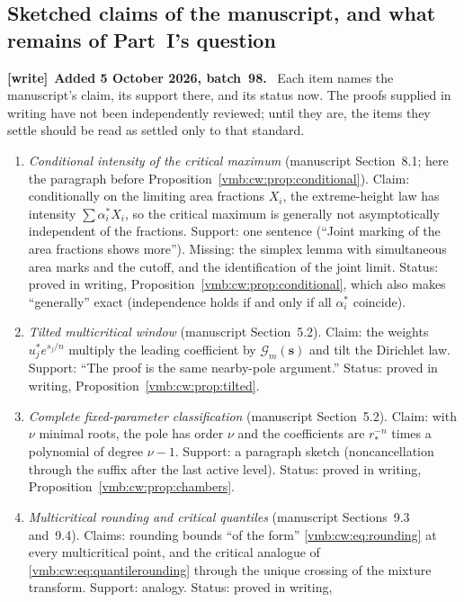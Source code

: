 \documentclass[11pt,a4paper]{article}
\numberwithin{equation}{section}
\theoremstyle{definition}\newtheorem{definition}[theorem]{Definition}
\theoremstyle{remark}\newtheorem{remark}[theorem]{Remark}
\newenvironment{writenote}[1][]{\par\smallskip\begingroup\small
 \noindent\textbf{[write]}\if\relax\detokenize{#1}\relax\else~\textbf{#1.}\fi\ }%
 {\par\endgroup\smallskip}
\begin{document}
\subsection{Sketched claims of the manuscript, and what remains of Part~I's question}
\label{vmb:cw:sec:q-write}
\begin{writenote}[Added 5 October 2026, batch~98]
Each item names the manuscript's claim, its support there, and its status
now. The proofs supplied in writing have not been independently reviewed;
until they are, the items they settle should be read as settled only to that
standard.
\begin{enumerate}[leftmargin=*,itemsep=2pt]
\item \emph{Conditional intensity of the critical maximum} (manuscript
 Section~8.1; here the paragraph before
 Proposition~\ref{vmb:cw:prop:conditional}). Claim: conditionally on the limiting
 area fractions $X_i$, the extreme-height law has intensity
 $\sum\alpha_i^*X_i$, so the critical maximum is generally not
 asymptotically independent of the fractions. Support: one sentence (``Joint
 marking of the area fractions shows more''). Missing: the simplex lemma with
 simultaneous area marks and the cutoff, and the identification of the joint
 limit. Status: proved in writing, Proposition~\ref{vmb:cw:prop:conditional},
 which also makes ``generally'' exact (independence holds if and only if all
 $\alpha_i^*$ coincide).
\item \emph{Tilted multicritical window} (manuscript Section~5.2). Claim: the
 weights $u_j^*e^{s_j/n}$ multiply the leading coefficient by
 $\mathcal G_m(\bm s)$ and tilt the Dirichlet law. Support: ``The proof is the
 same nearby-pole argument.'' Status: proved in writing,
 Proposition~\ref{vmb:cw:prop:tilted}.
\item \emph{Complete fixed-parameter classification} (manuscript
 Section~5.2). Claim: with $\nu$ minimal roots, the pole has order $\nu$ and
 the coefficients are $r_*^{-n}$ times a polynomial of degree $\nu-1$.
 Support: a paragraph sketch (noncancellation through the suffix after the
 last active level). Status: proved in writing,
 Proposition~\ref{vmb:cw:prop:chambers}.
\item \emph{Multicritical rounding and critical quantiles} (manuscript
 Sections~9.3 and~9.4). Claims: rounding bounds ``of the form''
 \eqref{vmb:cw:eq:rounding} at every multicritical point, and the critical
 analogue of \eqref{vmb:cw:eq:quantilerounding} through the unique crossing of
 the mixture transform. Support: analogy. Status: proved in writing,

\end{enumerate}
\end{writenote}
\end{document}
